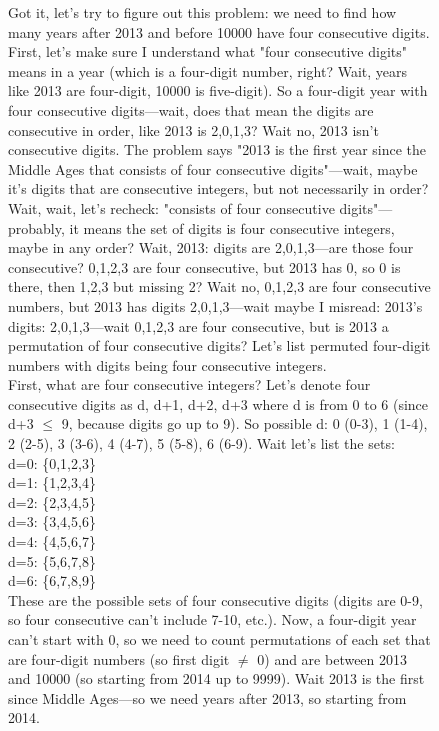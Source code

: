 \begin{figure}[!ht]
    \centering
    \begin{lrbox}{\DSRPrompt}
    \begin{promptbox}
    \raggedright
    \scriptsize\ttfamily
\setlength{\baselineskip}{1\baselineskip}


Got it, let's try to figure out this problem: we need to find how many years after 2013 and before 10000 have four consecutive digits. First, let's make sure I understand what "four consecutive digits" means in a year (which is a four-digit number, right? Wait, years like 2013 are four-digit, 10000 is five-digit). So a four-digit year with four consecutive digits—wait, does that mean the digits are consecutive in order, like 2013 is 2,0,1,3? Wait no, 2013 isn't consecutive digits. The problem says "2013 is the first year since the Middle Ages that consists of four consecutive digits"—wait, maybe it's digits that are consecutive integers, but not necessarily in order? Wait, wait, let's recheck: "consists of four consecutive digits"—probably, it means the set of digits is four consecutive integers, maybe in any order? Wait, 2013: digits are 2,0,1,3—are those four consecutive? 0,1,2,3 are four consecutive, but 2013 has 0, so 0 is there, then 1,2,3 but missing 2? Wait no, 0,1,2,3 are four consecutive numbers, but 2013 has digits 2,0,1,3—wait maybe I misread: 2013's digits: 2,0,1,3—wait 0,1,2,3 are four consecutive, but is 2013 a permutation of four consecutive digits? Let's list permuted four-digit numbers with digits being four consecutive integers.\\
First, what are four consecutive integers? Let's denote four consecutive digits as d, d+1, d+2, d+3 where d is from 0 to 6 (since d+3 $\leq$ 9, because digits go up to 9). So possible d: 0 (0-3), 1 (1-4), 2 (2-5), 3 (3-6), 4 (4-7), 5 (5-8), 6 (6-9). Wait let's list the sets:\\
d=0: \{0,1,2,3\}\\
d=1: \{1,2,3,4\}\\
d=2: \{2,3,4,5\}\\
d=3: \{3,4,5,6\}\\
d=4: \{4,5,6,7\}\\
d=5: \{5,6,7,8\}\\
d=6: \{6,7,8,9\}\\
These are the possible sets of four consecutive digits (digits are 0-9, so four consecutive can't include 7-10, etc.). Now, a four-digit year can't start with 0, so we need to count permutations of each set that are four-digit numbers (so first digit $\ne$ 0) and are between 2013 and 10000 (so starting from 2014 up to 9999). Wait 2013 is the first since Middle Ages—so we need years after 2013, so starting from 2014.\\

\end{promptbox}
\end{lrbox}
\end{figure}
